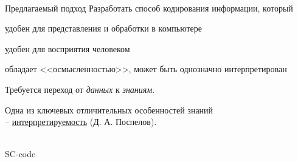 \begin{frame}{\\Предлагаемый подход}
	\topline
	\justifying
	\large
	Разработать способ кодирования информации, который
	
	\begin{textitemize}
		\item удобен для представления и обработки в компьютере
		\item удобен для восприятия человеком
		\item обладает <<осмысленностью>>, может быть однозначно интерпретирован		
	\end{textitemize}

	\bigskip
	Требуется переход от \textit{данных} к \textit{знаниям}.

	\bigskip
	Одна из ключевых отличительных особенностей знаний\\ -- \uline{интерпретируемость} (Д. А. Поспелов).

\end{frame}

\begin{frame}{\\SC-code}
	\topline
	\justifying
	\begin{SCn}
	\end{SCn}
\end{frame}

